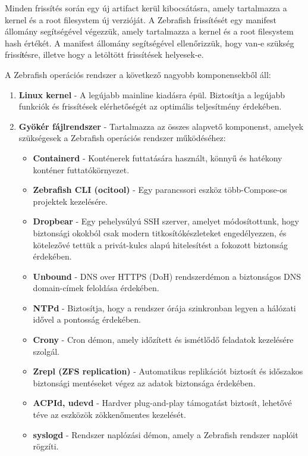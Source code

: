 Minden frissítés során egy új artifact kerül kibocsátásra, amely tartalmazza a kernel és a root filesystem új verzióját. A Zebrafish frissítését egy manifest állomány segítségével végezzük, amely tartalmazza a kernel és a root filesystem hash értékét. A manifest állomány segítségével ellenőrizzük, hogy van-e szükség frissíŧésre, illetve hogy a letöltött frissítések helyesek-e. 

A Zebrafish operációs rendszer a következő nagyobb komponensekből áll:

\begin{enumerate}
        \item \textbf{Linux kernel} - A legújabb mainline kiadásra épül. Biztosítja a legújabb funkciók és frissítések elérhetőségét az optimális teljesítmény érdekében.
        \item \textbf{Gyökér fájlrendszer} - Tartalmazza az összes alapvető komponenst, amelyek szükségesek a Zebrafish operációs rendszer működéséhez:
        \begin{itemize}
                \item \textbf{Containerd} - Konténerek futtatására használt, könnyű és hatékony konténer futtatókörnyezet.
                \item \textbf{Zebrafish CLI (ocitool)} - Egy parancssori eszköz több-Compose-os projektek kezelésére.
                \item \textbf{Dropbear} - Egy pehelysúlyú SSH szerver, amelyet módosítottunk, hogy biztonsági okokból csak modern titkosítókészleteket engedélyezzen, és kötelezővé tettük a privát-kulcs alapú hitelesítést a fokozott biztonság érdekében.
                \item \textbf{Unbound} - DNS over HTTPS (DoH) rendszerdémon a biztonságos DNS domain-címek feloldása érdekében.
                \item \textbf{NTPd} - Biztosítja, hogy a rendszer órája szinkronban legyen a hálózati idővel a pontosság érdekében.
                \item \textbf{Crony} - Cron démon, amely időzített és ismétlődő feladatok kezelésére szolgál.
                \item \textbf{Zrepl (ZFS replication)} - Automatikus replikációt biztosít és időszakos biztonsági mentéseket végez az adatok biztonsága érdekében.
                \item \textbf{ACPId, udevd} - Hardver plug-and-play támogatást biztosít, lehetővé téve az eszközök zökkenőmentes kezelését.
                \item \textbf{syslogd} - Rendszer naplózási démon, amely a Zebrafish rendszer naplóit rögzíti.
        \end{itemize}
\end{enumerate}

